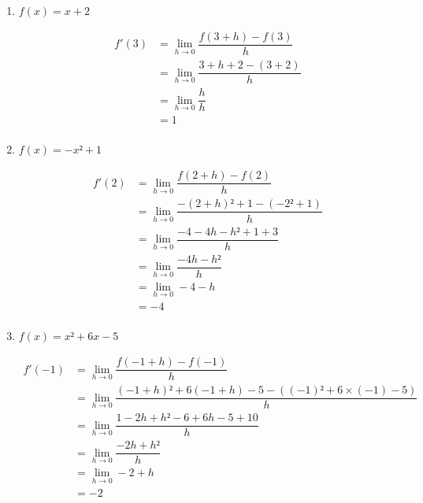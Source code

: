 \documentclass[
	classe=$1^{ere}STI2D$,
]{évaluation}
\begin{document}
\begin{exercice}
	\begin{enumerate}
		\item $f(x) = x + 2$

		      \begin{align*}
			      f'(3) & = \lim_{h→0} \dfrac{f(3+h) - f(3)}{h}       \\
			            & = \lim_{h→0} \dfrac{3 + h + 2 - (3 + 2)}{h} \\
			            & = \lim_{h→0} \dfrac{h}{h}                   \\
			            & = 1                                         \\
		      \end{align*}
		\item $f(x) = -x² + 1$

		      \begin{align*}
			      f'(2) & = \lim_{h→0} \dfrac{f(2+h) - f(2)}{h}             \\
			            & = \lim_{h→0} \dfrac{-(2 + h)² + 1 - (-2² + 1)}{h} \\
			            & = \lim_{h→0} \dfrac{-4 - 4h - h² + 1 + 3}{h}      \\
			            & = \lim_{h→0} \dfrac{-4h - h²}{h}                  \\
			            & = \lim_{h→0} -4 - h                               \\
			            & = -4                                              \\
		      \end{align*}
		\item $f(x) = x² + 6x - 5$

		      \begin{align*}
			      f'(-1) & = \lim_{h→0} \dfrac{f(-1+h) - f(-1)}{h}                                  \\
			             & = \lim_{h→0} \dfrac{(-1 + h)² + 6(-1 + h) - 5 - ((-1)² + 6×(-1) - 5)}{h} \\
			             & = \lim_{h→0} \dfrac{1 - 2h + h² - 6 + 6h - 5 + 10}{h}                    \\
			             & = \lim_{h→0} \dfrac{-2h + h²}{h}                                         \\
			             & = \lim_{h→0} -2 + h                                                      \\
			             & = -2                                                                     \\
		      \end{align*}
	\end{enumerate}
\end{exercice}
\end{document}
